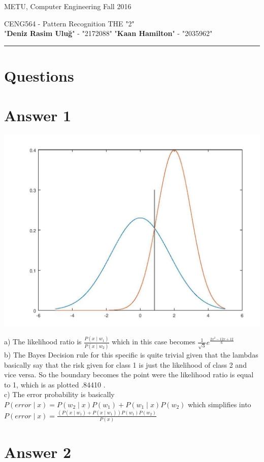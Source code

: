 \documentclass[12pt]{article}
\newcommand{\myheader}[4]
{\vspace*{-0.5in}
\noindent
{#1} \hfill {#3}

\noindent
{#2} \hfill {#4}

\noindent
\rule[8pt]{\textwidth}{1pt}

\vspace{1ex} 
}  %
\newcommand{\myalgsheader}[0]
{\myheader{METU, Computer Engineering}
{CENG564 - Pattern Recognition THE "2" \\ "{\bf Deniz Rasim Uluğ}"  - "2172088" "{\bf Kaan Hamilton}"  - "2035962"} {Fall 2016}{}}
\begin{document}
\myalgsheader
{}
\pagestyle{plain}



\section*{Questions} 

\section*{Answer 1}
\includegraphics[scale=0.35]{q1.jpeg}

 a) The likelihood ratio is $\frac{P(x\mid w_{1})}{P(x\mid w_{2})}$ which in this case becomes $\frac{1}{\sqrt{3}}e^{\frac{2x^{2}-12x+12}{6}}$\\
 
 b) The Bayes Decision rule for this specific is quite trivial given that the lambdas basically say that the risk given for class 1 is just the likelihood of class 2 and vice versa. So the boundary becomes the point were the likelihood ratio is equal to 1, which is as plotted .84410 . \\
 
 c) The error probability is basically  $P(error\mid x)=P(w_{2}\mid x)P(w_{1})+P(w_{1}\mid x)P(w_{2})$ which simplifies into $P(error\mid x)=\frac{(P(x\mid w_{1})+P(x\mid w_{1}))P(w_{1})P(w_{2})}{P(x)}$


\section*{Answer 2}
\end{document}
